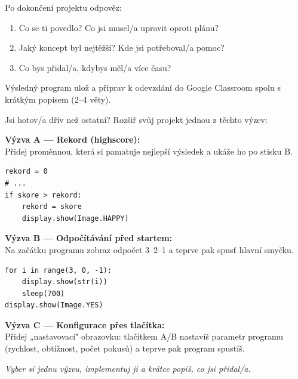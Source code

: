 \begin{ukol}

Po dokončení projektu odpověz:

\begin{enumerate}
  \item Co se ti povedlo? Co jsi musel/a upravit oproti plánu?
  \item Jaký koncept byl nejtěžší? Kde jsi potřeboval/a pomoc?
  \item Co bys přidal/a, kdybys měl/a více času?
\end{enumerate}

\odpoved[4cm]

\noindent Výsledný program ulož a připrav k odevzdání do Google Classroom
spolu s krátkým popisem (2--4 věty).

\end{ukol}

\begin{bonusukol}

Jsi hotov/a dřív než ostatní? Rozšiř svůj projekt jednou z těchto výzev:

\medskip
\textbf{Výzva A — Rekord (highscore):}\\
Přidej proměnnou, která si pamatuje nejlepší výsledek a ukáže ho po stisku B.
\begin{lstlisting}
rekord = 0
# ...
if skore > rekord:
    rekord = skore
    display.show(Image.HAPPY)
\end{lstlisting}

\medskip
\textbf{Výzva B — Odpočítávání před startem:}\\
Na začátku programu zobraz odpočet 3–2–1 a teprve pak spusť hlavní smyčku.
\begin{lstlisting}
for i in range(3, 0, -1):
    display.show(str(i))
    sleep(700)
display.show(Image.YES)
\end{lstlisting}

\medskip
\textbf{Výzva C — Konfigurace přes tlačítka:}\\
Přidej „nastavovací" obrazovku: tlačítkem A/B nastavíš parametr programu
(rychlost, obtížnost, počet pokusů) a teprve pak program spustíš.

\medskip
\textit{Vyber si jednu výzvu, implementuj ji a krátce popiš, co jsi přidal/a.}

\odpoved[3cm]

\end{bonusukol}


